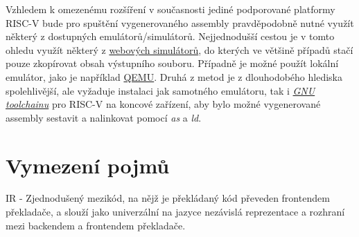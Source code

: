 \documentclass{article}
\def\xxx#1{\textcolor{red!50}{\itshape #1}}
\begin{document}
Vzhledem k omezenému rozšíření v současnosti jediné podporované platformy RISC-V bude pro spuštění vygenerovaného assembly pravděpodobně nutné využít některý z dostupných emulátorů/simulátorů. Nejjednodušší cestou je v tomto ohledu využít některý z \href{https://riscv-simulator-five.vercel.app/}{webových simulátorů}, do kterých ve většině případů stačí pouze zkopírovat obsah výstupního souboru. Případně je možné použít lokální emulátor, jako je například \href{https://wiki.archlinux.org/title/QEMU}{QEMU}. Druhá z metod je z dlouhodobého hlediska spolehlivější, ale vyžaduje instalaci jak samotného emulátoru, tak i \href{https://github.com/riscv-collab/riscv-gnu-toolchain}{\textit{GNU toolchainu}} pro RISC-V na koncové zařízení, aby bylo možné vygenerované assembly sestavit a nalinkovat pomocí \textit{as} a \textit{ld}. 

\clearpage\appendix
\section{Vymezení pojmů}

IR - Zjednodušený mezikód, na nějž je překládaný kód převeden frontendem překladače, a slouží jako univerzální na jazyce nezávislá reprezentace a rozhraní mezi backendem a frontendem překladače.

\end{document}
